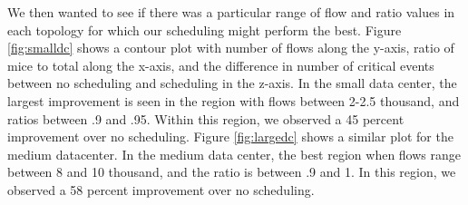 We then wanted to see if there was a particular range of flow and ratio values
in each topology for which our scheduling might perform the best. Figure
\ref{fig:smalldc} shows a contour plot with number of flows along
the y-axis, ratio of mice to total along the x-axis, and the difference in
number of critical events between no scheduling and scheduling in the z-axis. In
the small data center, the largest improvement is seen in the region with flows
between 2-2.5 thousand, and ratios between .9 and .95. Within this region, we
observed a 45 percent improvement over no scheduling. Figure \ref{fig:largedc}
shows a similar plot for the medium datacenter. In the medium data center,
the best region when flows range between 8 and 10 thousand, and the ratio is
between .9 and 1. In this region, we observed a 58 percent improvement over no
scheduling.
